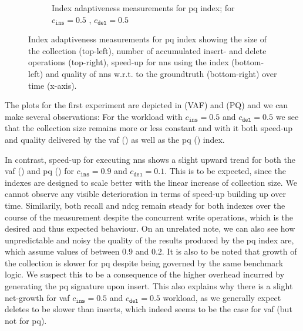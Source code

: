 \begin{figure}[p]
\begin{subfigure}[b]{\textwidth}
        \caption{Index adaptiveness measurements for \acrshort{pq} index; for $c_{\texttt{ins}} = 0.5$ , $c_{\texttt{del}} = 0.5$}
        \label{figure:index_adaptiveness_pq_50_50}
    \end{subfigure}
    \caption{Index adaptiveness measurements for \acrshort{pq} index showing the size of the collection (top-left), number of accumulated insert- and delete operations (top-right), speed-up for \acrshort{nns} using the index (bottom-left) and quality of \acrshort{nns} w.r.t. to the groundtruth (bottom-right) over time (x-axis).}
    \label{figure:index_adaptiveness_pq}
\end{figure}

The plots for the first experiment are depicted in  (VAF) and  (PQ) and we can make several observations: For the workload with $c_{\texttt{ins}} = 0.5$ and $c_{\texttt{del}} = 0.5$ we see that the collection size remains more or less constant and with it both speed-up and quality delivered by the \acrshort{vaf} () as well as the \acrshort{pq} () index.

In contrast, speed-up for executing \acrshort{nns} shows a slight upward trend for both the \acrshort{vaf} () and \acrshort{pq} () for $c_{\texttt{ins}} = 0.9$ and $c_{\texttt{del}} = 0.1$. This is to be expected, since the indexes are designed to scale better with the linear increase of collection size. We cannot observe any visible deterioration in terms of speed-up building up over time. Similarily, both recall and \acrshort{ndcg} remain steady for both indexes over the course of the measurement despite the concurrent write operations, which is the desired and thus expected behaviour. On an unrelated note, we can also see how unpredictable and noisy the quality of the results produced by the \acrshort{pq} index are, which assume values of between $0.9$ and $0.2$. It is also to be noted that growth of the collection is slower for \acrshort{pq} despite being governed by the same benchmark logic. We suspect this to be a consequence of the higher overhead incurred by generating the \acrshort{pq} signature upon insert. This also explains why there is a slight net-growth for \acrshort{vaf} $c_{\texttt{ins}} = 0.5$ and $c_{\texttt{del}} = 0.5$ workload, as we generally expect deletes to be slower than inserts, which indeed seems to be the case for \acrshort{vaf} (but not for \acrshort{pq}).


